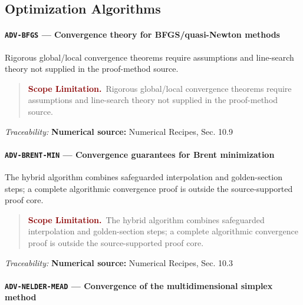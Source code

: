 \documentclass[10pt]{article}
\newcommand{\pidraw}[1]{\begingroup\urlstyle{tt}\nolinkurl{#1}\endgroup}
\theoremstyle{definition}
\theoremstyle{remark}
\newenvironment{scopelimitation}
{\begin{quote}\small\noindent\textbf{\textcolor{darkred}{Scope Limitation.}}\ }
{\end{quote}}
\begin{document}
\subsection{Optimization Algorithms}

\label{prf:ADV-BFGS}

\paragraph{\pidraw{ADV-BFGS} --- Convergence theory for BFGS/quasi-Newton methods}

Rigorous global/local convergence theorems require assumptions and line-search theory not supplied in the proof-method source.

\begin{scopelimitation}Rigorous global/local convergence theorems require assumptions and line-search theory not supplied in the proof-method source.\end{scopelimitation}

\smallskip\noindent\textit{Traceability:} \textbf{Numerical source:} Numerical Recipes, Sec. 10.9\par

\label{prf:ADV-BRENT-MIN}

\paragraph{\pidraw{ADV-BRENT-MIN} --- Convergence guarantees for Brent minimization}

The hybrid algorithm combines safeguarded interpolation and golden-section steps; a complete algorithmic convergence proof is outside the source-supported proof core.

\begin{scopelimitation}The hybrid algorithm combines safeguarded interpolation and golden-section steps; a complete algorithmic convergence proof is outside the source-supported proof core.\end{scopelimitation}

\smallskip\noindent\textit{Traceability:} \textbf{Numerical source:} Numerical Recipes, Sec. 10.3\par

\label{prf:ADV-NELDER-MEAD}

\paragraph{\pidraw{ADV-NELDER-MEAD} --- Convergence of the multidimensional simplex method}
\end{document}
